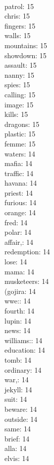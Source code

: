 \begin{multicols}{6}
  \\ patrol: 15
  \\ chris: 15
  \\ fingers: 15
  \\ walls: 15
  \\ mountains: 15
  \\ showdown: 15
  \\ assault: 15
  \\ nanny: 15
  \\ spies: 15
  \\ calling: 15
  \\ image: 15
  \\ kills: 15
  \\ dragons: 15
  \\ plastic: 15
  \\ femme: 15
  \\ waters: 14
  \\ mafia: 14
  \\ traffic: 14
  \\ havana: 14
  \\ priest: 14
  \\ furious: 14
  \\ orange: 14
  \\ fred: 14
  \\ polar: 14
  \\ affair,: 14
  \\ redemption: 14
  \\ lose: 14
  \\ mama: 14
  \\ musketeers: 14
  \\ (gojira: 14
  \\ wwe:: 14
  \\ fourth: 14
  \\ lupin: 14
  \\ news: 14
  \\ williams:: 14
  \\ education: 14
  \\ tomb: 14
  \\ ordinary: 14
  \\ war,: 14
  \\ jekyll: 14
  \\ suit: 14
  \\ beware: 14
  \\ outside: 14
  \\ same: 14
  \\ brief: 14
  \\ alla: 14
  \\ elvis: 14

\end{multicols}
